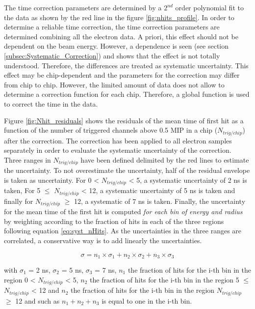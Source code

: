 The time correction parameters are determined by a $2^{nd}$ order polynomial fit to the data as shown by the red line in the figure \ref{fig:nhits_profile}. In order to determine a reliable time correction, the time correction parameters are determined combining all the electron data. A priori, this effect should not be dependent on the beam energy. However, a dependence is seen (see section \ref{subsec:Systematic_Correction}) and shows that the effect is not totally understood. Therefore, the differences are treated as systematic uncertainty. This effect may be chip-dependent and the parameters for the correction may differ from chip to chip. However, the limited amount of data does not allow to determine a correction function for each chip. Therefore, a global function is used to correct the time in the data.

Figure \ref{fig:Nhit_residuals} shows the residuals of the mean time of first hit as a function of the number of triggered channels above 0.5 MIP in a chip ($N_{trig/chip}$) after the correction. The correction has been applied to all electron samples separately in order to evaluate the systematic uncertainty of the correction. Three ranges in $N_{trig/chip}$ have been defined delimited by the red lines to estimate the uncertainty. To not overestimate the uncertainty, half of the residual envelope is taken as uncertainty. For 0 < $N_{trig/chip}$ < 5, a systematic uncertainty of 2 ns is taken, For 5 $\leq$ $N_{trig/chip}$ < 12, a systematic uncertainty of 5 ns is taken and finally for $N_{trig/chip}$ $\geq$ 12, a systematic of 7 ns is taken. Finally, the uncertainty for the mean time of the first hit is computed \textit{for each bin of energy and radius} by weighting according to the fraction of hits in each of the three regions following equation \ref{eq:syst_nHits}. As the uncertainties in the three ranges are correlated, a conservative way is to add linearly the uncertainties.

\begin{equation}
  \sigma = n_1 \times \sigma_1 + n_2 \times \sigma_2 + n_3 \times \sigma_3 \label{eq:syst_nHits}
\end{equation}

with $\sigma_1$ = 2 ns, $\sigma_2$ = 5 ns, $\sigma_3$ = 7 ns, $n_1$ the fraction of hits for the i-th bin in the region 0 < $N_{trig/chip}$ < 5, $n_2$ the fraction of hits for the i-th bin in the region 5 $\leq$ $N_{trig/chip}$ < 12 and $n_2$ the fraction of hits for the i-th bin in the region $N_{trig/chip}$ $\geq$ 12 and such as $n_1 + n_2 + n_3$ is equal to one in the i-th bin.

